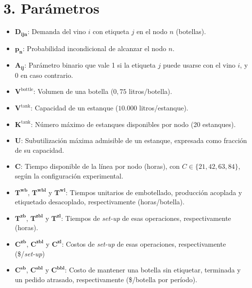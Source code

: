 \documentclass[11pt, letterpaper]{article}
\begin{document}
\section*{3. Parámetros}
\begin{itemize}
    \item $\bm{D_{ijn}}$: Demanda del vino $i$ con etiqueta $j$
    en el nodo $n$ (botellas).
    
    \item $\bm{p_n}$: Probabilidad incondicional de alcanzar el nodo $n$.
    
    \item $\bm{A_{ij}}$: Parámetro binario que vale 1 si la etiqueta $j$ puede usarse con el vino $i$, y 0 en caso contrario.

    \item $\bm{V^{\mathrm{bottle}}}$: Volumen de una botella
    ($0{,}75$ litros/botella).
    
    \item $\bm{V^{\mathrm{tank}}}$: Capacidad de un estanque
    ($10.000$ litros/estanque).
    
    \item $\bm{K^{\mathrm{tank}}}$: Número máximo de estanques
    disponibles por nodo (20 estanques).
    
    \item $\bm{U}$: Subutilización máxima admisible de un estanque,
    expresada como fracción de su capacidad.
    
    \item $\bm{C}$: Tiempo disponible de la línea por nodo (horas),
    con $C\in\{21,42,63,84\}$, según la configuración experimental.

    \item $\bm{T^{wb}}$, $\bm{T^{wbl}}$ y $\bm{T^{wl}}$:
    Tiempos unitarios de embotellado, producción acoplada y
    etiquetado desacoplado, respectivamente (horas/botella).

    \item $\bm{T^{zb}}$, $\bm{T^{zbl}}$ y $\bm{T^{zl}}$: Tiempos de \textit{set-up} de esas operaciones, respectivamente (horas).

    \item $\bm{C^{zb}}$, $\bm{C^{zbl}}$ y $\bm{C^{zl}}$: Costos de \textit{set-up} de esas operaciones, respectivamente (\$/\textit{set-up})
    
    \item $\bm{C^{sb}}$, $\bm{C^{sbl}}$ y $\bm{C^{bbl}}$: Costo de mantener una botella sin etiquetar, terminada y un pedido atrasado, respectivamente
    (\$/botella por período).


\end{itemize}
\end{document}
